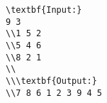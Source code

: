 \begin{verbatim}
\textbf{Input:}
9 3
\\1 5 2
\\5 4 6
\\8 2 1
\\
\\\textbf{Output:}
\\7 8 6 1 2 3 9 4 5 \end{verbatim}